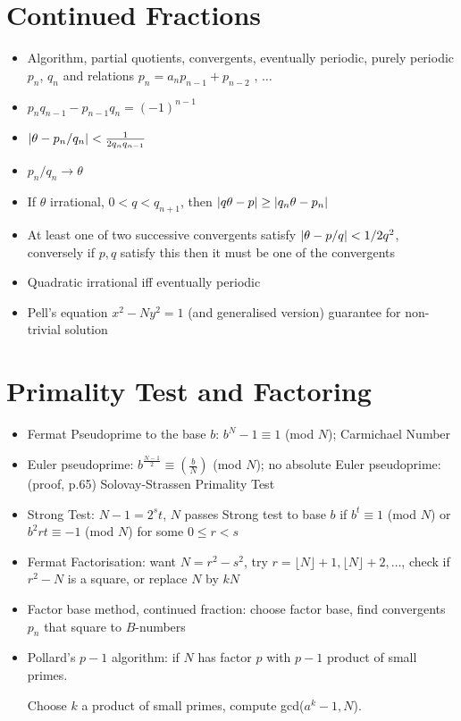\section{Continued Fractions}
\begin{itemize}
\item Algorithm, partial quotients, convergents, eventually periodic, purely periodic $p_n$, $q_n$ and relations $p_n = a_n p_{n-1} + p_{n-2}$ , $\dots$
\item $p_n q_{n-1}-p_{n-1} q_n = (-1)^{n-1}$
\item $\left| \theta -p_n/q_n \right| < \frac{1}{2q_n q_{n-1}} $
\item $p_n/q_n \to \theta$
\item If $\theta$ irrational, $0<q<q_{n+1}$, then $\left| q\theta - p \right| \geq \left| q_n \theta - p_n \right|$
\item At least one of two successive convergents satisfy $\left| \theta -p/q \right| < 1/2q^2$, conversely if $p,q$ satisfy this then it must be one of the convergents
\item Quadratic irrational iff eventually periodic
\item Pell's equation $x^2-Ny^2 = 1$ (and generalised version) guarantee for non-trivial solution
\end{itemize}
\section{Primality Test and Factoring}
\begin{itemize}
    \item Fermat Pseudoprime to the base $b$: $b^N-1 \equiv 1 $ (mod $N$); Carmichael Number
    \item Euler pseudoprime: $b^\frac{N-1}{2} \equiv \left(\frac{b}{N}\right) $ (mod $N$); no absolute Euler pseudoprime: (proof, p.65) Solovay-Strassen Primality Test
    \item Strong Test: $N-1 = 2^s t$, $N$ passes Strong test to base $b$ if $b^t \equiv 1$ (mod $N$) or $b^2r t \equiv -1$ (mod $N$) for some $0\leq r < s$
    \item Fermat Factorisation: want $N=r^2-s^2$, try $r = \lfloor N \rfloor + 1, \lfloor N \rfloor + 2, \dots$, check if $r^2-N$ is a square, or replace $N$ by $kN$
    \item Factor base method, continued fraction: choose factor base, find convergents $p_n$ that square to $B$-numbers
    \item Pollard's $p-1$ algorithm: if $N$ has factor $p$ with $p-1$ product of small primes.
    
    Choose $k$ a product of small primes, compute gcd($a^k-1,N$). 
\end{itemize}
